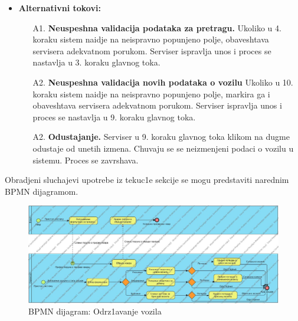 \begin{itemize}
{}
\item{\textbf{Alternativni tokovi:} 
\begin{enumerate}
    \item [A1.] \textbf{Neuspeshna validacija podataka za pretragu.} Ukoliko u 4. koraku sistem naidje na neispravno popunjeno polje, obaveshtava servisera adekvatnom porukom. Serviser ispravlja unos i proces se nastavlja u 3. koraku glavnog toka.
    \item [A2.] \textbf{Neuspeshna validacija novih podataka o vozilu} Ukoliko u 10. koraku sistem naidje na neispravno popunjeno polje, markira ga i obaveshtava servisera adekvatnom porukom. Serviser ispravlja unos i proces se nastavlja u 9. koraku glavnog toka.
    \item[A2.] \textbf{Odustajanje.} Serviser u 9. koraku glavnog toka klikom na dugme odustaje od unetih izmena. Chuvaju se se neizmenjeni podaci o vozilu u sistemu. Proces se zavrshava.
\end{enumerate}
}
\end{itemize}


Obradjeni sluchajevi upotrebe iz tekuc1e sekcije se mogu predstaviti narednim BPMN dijagramom.
\newpage

\begin{figure}[h!]
    \includegraphics[angle = 90, scale = 0.35]{Slike/BPMN/BPMNodrzavanje.jpg}
    \centering
    \caption{BPMN dijagram: Odrz1avanje vozila}
    \label{BPMN odrzavanje}
\end{figure}  